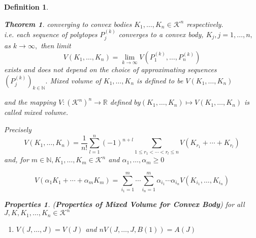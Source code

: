 \documentclass[oneside]{book}
\newtheorem{theorem}{Theorem}[section]
\newtheorem{mydef}{Definition}
\newtheorem{properties}{Properties}[section]
\begin{document}
\begin{mydef}
\begin{theorem}
   converging to convex bodies  $K_{1}, \ldots, K_{n} \in \mathcal{K}^{n}$ respectively.
  \\
   i.e. each sequence of polytopes $P_{j}^{(k)}$ converges to a convex body, 
   $K_{j}, j=1, \ldots, n,$ as $k \rightarrow \infty,$ 
  then limit 
  \begin{equation}
  \label{eq51}
V\left(K_{1}, \ldots, K_{n}\right)=\lim _{k \rightarrow \infty} V\left(P_{1}^{(k)}, \ldots, P_{n}^{(k)}\right)
\end{equation}
exists and does not depend on the choice of approximating sequences $\left(P_{j}^{(k)}\right)_{k \in \mathbb{N}}. $ \newline
 Mixed volume of $K_{1}, \ldots, K_{n} $ is defined to be $V\left(K_{1}, \ldots, K_{n}\right)$ \newline
 
  and the mapping $V:\left(\mathcal{K}^{n}\right)^{n} \rightarrow \mathbb{R}$ defined $b y\left(K_{1}, \ldots, K_{n}\right) \mapsto V\left(K_{1}, \ldots, K_{n}\right)$ is called mixed volume.\newline
  
Precisely 
\begin{equation} 
\label{eq52}
V\left(K_{1}, \ldots, K_{n}\right)=\frac{1}{n !} \sum_{l=1}^{n}(-1)^{n+l} \sum_{1 \leq r_{1}<\cdots<r_{l} \leq n} V\left(K_{r_{1}}+\cdots+K_{r_{l}}\right)
\end{equation}
and, for $m \in \mathbb{N}, K_{1}, \ldots, K_{m} \in \mathcal{K}^{n}$ and $\alpha_{1}, \ldots, \alpha_{m} \geq 0$
 
 
\begin{equation}
\label{eq53}
V\left(\alpha_{1} K_{1}+\cdots+\alpha_{m} K_{m}\right)=\sum_{i_{1}=1}^{m} \cdots \sum_{i_{n}=1}^{m} \alpha_{i_{1}} \cdots \alpha_{i_{n}} V\left(K_{i_{1}}, \ldots, K_{i_{n}}\right)
\end{equation}
 \end{theorem}
 
 \begin{properties} (\textbf{Properties of Mixed Volume for Convex Body})
 \label{prop :2}
 for all $J, K, K_{1}, \ldots, K_{n} 
  \in \mathcal{K}^{n}$ \\ 
  \begin{enumerate}
      
  \item \label{prop :2}
$V(J, \ldots, J)=V(J)$ and $ nV(J, \ldots, J, B(1))=A(J)$ 


\end{enumerate}
\end{properties}
\end{mydef}
\end{document}
